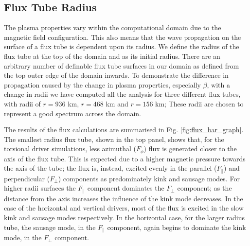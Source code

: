 \subsection{Flux Tube Radius}
The plasma properties vary within the computational domain due to the magnetic field configuration.
This also means that the wave propagation on the surface of a flux tube is dependent upon its radius. 
We define the radius of the flux tube at the top of the domain and as its initial radius.
There are an arbitrary number of definable flux tube surfaces in our domain as defined from the top outer edge of the domain inwards. 
To demonstrate the difference in propagation caused by the change in plasma properties, especially $\beta$, with a change in radii we have computed all the analysis for three different flux tubes, with radii of $r=936$ km, $r=468$ km and  $r=156$ km; These radii are chosen to represent a good spectrum across the domain.

The results of the flux calculations are summarised in Fig. \ref{fig:flux_bar_graph}.
The smallest radius flux tube, shown in the top panel, shows that, for the torsional driver simulations, less azimuthal ($F_\phi$) flux is generated closer to the axis of the flux tube. 
This is expected due to a higher magnetic pressure towards the axis of the tube; the flux is, instead, excited evenly in the parallel ($F_\parallel$) and perpendicular ($F_\perp$) components as predominately kink and sausage modes. 
For higher radii surfaces the $F_\parallel$ component dominates the $F_\perp$ component; as the distance from the axis increases the influence of the kink mode decreases.
In the case of the horizontal and vertical drivers, most of the flux is excited in the slow kink and sausage modes respectively.
In the horizontal case, for the larger radius tube, the sausage mode, in the $F_\parallel$ component, again begins to dominate the kink mode, in the $F_\perp$ component.
